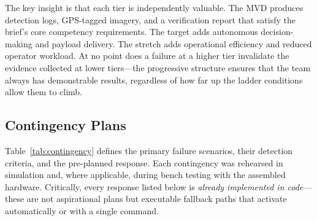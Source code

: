 The key insight is that each tier is independently valuable.  The MVD produces detection logs, GPS-tagged imagery, and a verification report that satisfy the brief's core competency requirements.  The target adds autonomous decision-making and payload delivery.  The stretch adds operational efficiency and reduced operator workload.  At no point does a failure at a higher tier invalidate the evidence collected at lower tiers---the progressive structure ensures that the team always has demonstrable results, regardless of how far up the ladder conditions allow them to climb.

\FloatBarrier
\subsection{Contingency Plans}\label{sec:contingencies}

Table~\ref{tab:contingency} defines the primary failure scenarios, their detection criteria, and the pre-planned response.  Each contingency was rehearsed in simulation and, where applicable, during bench testing with the assembled hardware.  Critically, every response listed below is \emph{already implemented in code}---these are not aspirational plans but executable fallback paths that activate automatically or with a single command.

